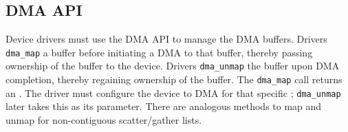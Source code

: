\subsection{DMA API}
Device drivers must use the DMA API to manage the DMA buffers. Drivers \texttt{dma\_map} a buffer before initiating a DMA to that buffer, thereby passing ownership of
the buffer to the device. Drivers \texttt{dma\_unmap} the buffer upon
DMA completion, thereby regaining ownership of the buffer.
The \texttt{dma\_map} call returns an \iova. The driver must configure the device to DMA for that specific \iova;
\texttt{dma\_unmap} later takes this \iova as its parameter. There are analogous methods to map and unmap for non-contiguous scatter/gather lists.